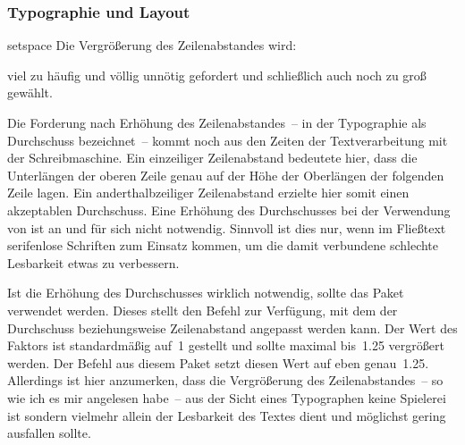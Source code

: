 \subsubsection{Typographie und Layout}
%
\begin{packages}
\item[setspace]
  Die Vergrößerung des Zeilenabstandes wird:
  \begin{enumerate}[itemindent=0pt,labelwidth=*,labelsep=1em,label=\Roman*.]
  \itempackages viel zu häufig und völlig unnötig gefordert und
  \itempackages schließlich auch noch zu groß gewählt.
  \end{enumerate}
  Die Forderung nach Erhöhung des Zeilenabstandes~-- in der Typographie als 
  Durchschuss bezeichnet~-- kommt noch aus den Zeiten der Textverarbeitung mit 
  der Schreibmaschine. Ein einzeiliger Zeilenabstand bedeutete hier, dass die 
  Unterlängen der oberen Zeile genau auf der Höhe der Oberlängen der folgenden 
  Zeile lagen. Ein anderthalbzeiliger Zeilenabstand erzielte hier somit einen 
  akzeptablen Durchschuss. Eine Erhöhung des Durchschusses bei der Verwendung 
  von  ist an und für sich nicht notwendig. Sinnvoll ist dies 
  nur, wenn im Fließtext serifenlose Schriften zum Einsatz kommen, um die damit 
  verbundene schlechte Lesbarkeit etwas zu verbessern.
  
  Ist die Erhöhung des Durchschusses wirklich notwendig, sollte das Paket 
   verwendet werden. Dieses stellt den Befehl 
   zur Verfügung, mit dem der Durchschuss 
  beziehungsweise Zeilenabstand angepasst werden kann. Der Wert des Faktors 
  ist standardmäßig auf~1 gestellt und sollte maximal bis~1.25 vergrößert 
  werden. Der Befehl  aus diesem Paket setzt diesen Wert 
  auf eben genau~1.25. Allerdings ist hier anzumerken, dass die Vergrößerung 
  des Zeilenabstandes~-- so wie ich es mir angelesen habe~-- aus der Sicht 
  eines Typographen keine Spielerei ist sondern vielmehr allein der Lesbarkeit 
  des Textes dient und möglichst gering ausfallen sollte.
  

\end{packages}
